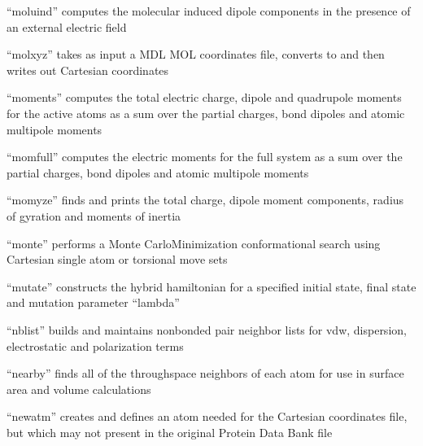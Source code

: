 \documentclass[letterpaper,11pt,english]{sphinxmanual}
\begin{document}

“moluind” computes the molecular induced dipole components
in the presence of an external electric field


“molxyz” takes as input a MDL MOL coordinates file,
converts to and then writes out Cartesian coordinates


“moments” computes the total electric charge, dipole and
quadrupole moments for the active atoms as a sum over the
partial charges, bond dipoles and atomic multipole moments


“momfull” computes the electric moments for the full system
as a sum over the partial charges, bond dipoles and atomic
multipole moments


“momyze” finds and prints the total charge, dipole moment
components, radius of gyration and moments of inertia


“monte” performs a Monte Carlo\sphinxhyphen{}Minimization conformational
search using Cartesian single atom or torsional move sets


“mutate” constructs the hybrid hamiltonian for a specified
initial state, final state and mutation parameter “lambda”


“nblist” builds and maintains nonbonded pair neighbor lists
for vdw, dispersion, electrostatic and polarization terms


“nearby” finds all of the through\sphinxhyphen{}space neighbors of each
atom for use in surface area and volume calculations



“newatm” creates and defines an atom needed for the
Cartesian coordinates file, but which may not present
in the original Protein Data Bank file

\end{document}
